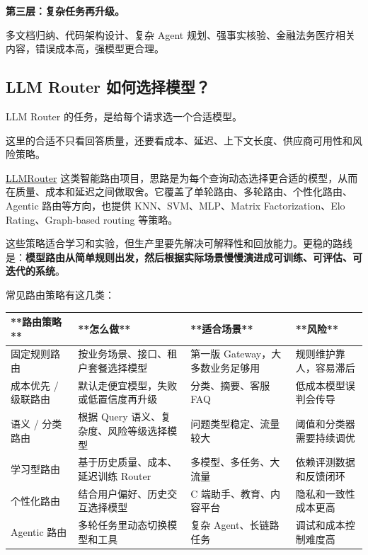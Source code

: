 \documentclass[10pt,a4paper]{ctexart}
\begin{document}
\textbf{第三层：复杂任务再升级。}



多文档归纳、代码架构设计、复杂 Agent 规划、强事实核验、金融法务医疗相关内容，错误成本高，强模型更合理。



\subsection{LLM Router 如何选择模型？}


LLM Router 的任务，是给每个请求选一个合适模型。



这里的合适不只看回答质量，还要看成本、延迟、上下文长度、供应商可用性和风险策略。



\href{https://github.com/ulab-uiuc/LLMRouter}{LLMRouter} 这类智能路由项目，思路是为每个查询动态选择更合适的模型，从而在质量、成本和延迟之间做取舍。它覆盖了单轮路由、多轮路由、个性化路由、Agentic 路由等方向，也提供 KNN、SVM、MLP、Matrix Factorization、Elo Rating、Graph-based routing 等策略。



这些策略适合学习和实验，但生产里要先解决可解释性和回放能力。更稳的路线是：\textbf{模型路由从简单规则出发，然后根据实际场景慢慢演进成可训练、可评估、可迭代的系统}。



常见路由策略有这几类：


{\footnotesize
\begin{tabularx}{\textwidth}{|X|X|X|X|}
\hline
\textbf{**路由策略**} & \textbf{**怎么做**} & \textbf{**适合场景**} & \textbf{**风险**} \\
\hline
固定规则路由 & 按业务场景、接口、租户套餐选择模型 & 第一版 Gateway，大多数业务足够用 & 规则维护靠人，容易滞后 \\
\hline
成本优先 / 级联路由 & 默认走便宜模型，失败或低置信度再升级 & 分类、摘要、客服 FAQ & 低成本模型误判会传导 \\
\hline
语义 / 分类路由 & 根据 Query 语义、复杂度、风险等级选择模型 & 问题类型稳定、流量较大 & 阈值和分类器需要持续调优 \\
\hline
学习型路由 & 基于历史质量、成本、延迟训练 Router & 多模型、多任务、大流量 & 依赖评测数据和反馈闭环 \\
\hline
个性化路由 & 结合用户偏好、历史交互选择模型 & C 端助手、教育、内容平台 & 隐私和一致性成本更高 \\
\hline
Agentic 路由 & 多轮任务里动态切换模型和工具 & 复杂 Agent、长链路任务 & 调试和成本控制难度高 \\
\hline
\end{tabularx}
}
\end{document}

